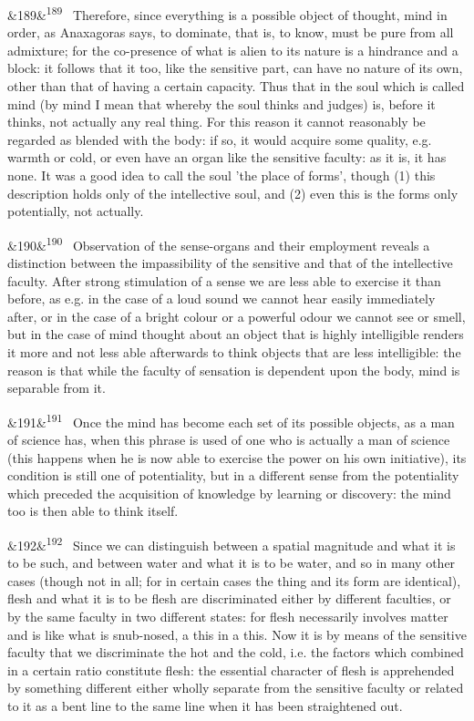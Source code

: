 \documentclass[12pt]{article}
\newcommand{\para}[1][]{\par\noindent\ifx&#1&\else\textsuperscript{\footnotesize #1}~\fi}
\begin{document}
\para[189] Therefore, since everything is a possible object of thought, mind in order, as Anaxagoras says, to dominate, that is, to know, must be pure from all admixture; for the co-presence of what is alien to its nature is a hindrance and a block: it follows that it too, like the sensitive part, can have no nature of its own, other than that of having a certain capacity. Thus that in the soul which is called mind (by mind I mean that whereby the soul thinks and judges) is, before it thinks, not actually any real thing. For this reason it cannot reasonably be regarded as blended with the body: if so, it would acquire some quality, e.g. warmth or cold, or even have an organ like the sensitive faculty: as it is, it has none. It was a good idea to call the soul 'the place of forms', though (1) this description holds only of the intellective soul, and (2) even this is the forms only potentially, not actually.

\para[190] Observation of the sense-organs and their employment reveals a distinction between the impassibility of the sensitive and that of the intellective faculty. After strong stimulation of a sense we are less able to exercise it than before, as e.g. in the case of a loud sound we cannot hear easily immediately after, or in the case of a bright colour or a powerful odour we cannot see or smell, but in the case of mind thought about an object that is highly intelligible renders it more and not less able afterwards to think objects that are less intelligible: the reason is that while the faculty of sensation is dependent upon the body, mind is separable from it.

\para[191] Once the mind has become each set of its possible objects, as a man of science has, when this phrase is used of one who is actually a man of science (this happens when he is now able to exercise the power on his own initiative), its condition is still one of potentiality, but in a different sense from the potentiality which preceded the acquisition of knowledge by learning or discovery: the mind too is then able to think itself.

\para[192] Since we can distinguish between a spatial magnitude and what it is to be such, and between water and what it is to be water, and so in many other cases (though not in all; for in certain cases the thing and its form are identical), flesh and what it is to be flesh are discriminated either by different faculties, or by the same faculty in two different states: for flesh necessarily involves matter and is like what is snub-nosed, a this in a this. Now it is by means of the sensitive faculty that we discriminate the hot and the cold, i.e. the factors which combined in a certain ratio constitute flesh: the essential character of flesh is apprehended by something different either wholly separate from the sensitive faculty or related to it as a bent line to the same line when it has been straightened out.
\end{document}
